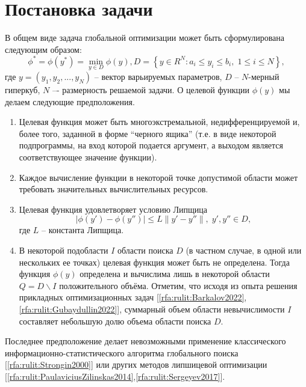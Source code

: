 \documentclass[10pt,a4paper]{book}
\begin{document}
\section{Постановка задачи}
В общем виде задача глобальной оптимизации может быть сформулирована следующим образом:
\begin{equation}\label{eq1} 
\phi^*=\phi(y^* )=\min_{y \in D} \phi(y), D=\left\{ y \in R^N: a_i \leq y_i \leq b_i, \; 1 \leq i \leq N \right\},
\end{equation}
где $y=(y_1,y_2,...,y_N)$ -- вектор варьируемых параметров, $D$ -- $N$-мерный гиперкуб, $N$ –- размерность решаемой задачи.
О целевой функции $\phi (y)$ мы делаем следующие предположения.

\begin{enumerate}
\item{Целевая функция может быть многоэкстремальной, недифференцируемой и, более того, заданной в форме ``черного ящика'' (т.е. в виде некоторой подпрограммы, на вход которой подается аргумент, а выходом является соответствующее значение функции).}
\item{Каждое вычисление функции в некоторой точке допустимой области может требовать значительных вычислительных ресурсов.}
\item{Целевая функция удовлетворяет условию Липщица
\begin{equation}\label{eq3} 
| \phi (y')-\phi (y'') | \leq L \| y'-y'' \|, \; y',y'' \in D,
\end{equation}
где $L$ -- константа Липщица.}
\item{В некоторой подобласти $I$ области поиска $D$ (в частном случае, в одной или нескольких ее точках) целевая функция может быть не определена. Тогда функция $\phi(y)$ определена и вычислима лишь в некоторой области $Q = D \backslash I$ положительного объёма. Отметим, что исходя из опыта решения прикладных оптимизационных задач [\ref{rfa:rulit:Barkalov2022},\ref{rfa:rulit:Gubaydullin2022}], суммарный объем области невычислимости $I$ составляет небольшую долю объема области поиска $D$.}
\end{enumerate}

Последнее предположение делает невозможными применение классического информационно-статистического алгоритма глобального поиска  [\ref{rfa:rulit:Strongin2000}] или других методов липшицевой оптимизации [\ref{rfa:rulit:PaulaviciusZilinskas2014},\ref{rfa:rulit:Sergeyev2017}].
\end{document}
